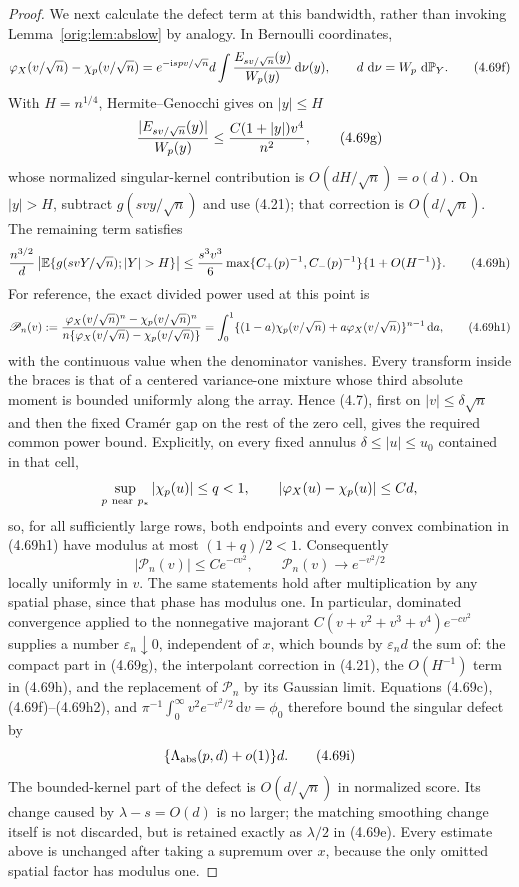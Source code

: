 \documentclass[11pt,a4paper]{article}
\numberwithin{equation}{section}
\theoremstyle{definition}
\theoremstyle{remark}
\newcommand{\E}{\mathbb E}
\newcommand{\Pp}{\mathbb P}
\newcommand{\ii}{\mathrm i}
\newcommand{\dd}{\,\mathrm d}
\begin{document}
\begin{proof}
We next calculate the defect term at this bandwidth, rather than invoking
Lemma~\ref{orig:lem:abslow} by analogy.  In Bernoulli coordinates,
\[
 \varphi_X(v/\sqrt n)-\chi_p(v/\sqrt n)
 =e^{-\ii spv/\sqrt n}d\int
       {E_{sv/\sqrt n}(y)\over W_p(y)}\dd\nu(y),
 \qquad d\,\dd\nu=W_p\,\dd\Pp_Y.                     \tag{4.69f}
\]
With $H=n^{1/4}$, Hermite--Genocchi gives on $|y|\le H$
\[
 { |E_{sv/\sqrt n}(y)|\over W_p(y)}
 \le {C(1+|y|)v^4\over n^2},                         \tag{4.69g}
\]
whose normalized singular-kernel contribution is $O(dH/\sqrt n)=o(d)$.
On $|y|>H$, subtract
$g(svy/\sqrt n)$ and use (4.21); that correction is $O(d/\sqrt n)$.
The remaining term satisfies
\[
 {n^{3/2}\over d}
 \left|\E\{g(svY/\sqrt n);|Y|>H\}\right|
 \le {s^3v^3\over6}
 \max\{C_+(p)^{-1},C_-(p)^{-1}\}
        \{1+O(H^{-1})\}.                               \tag{4.69h}
\]
For reference, the exact divided power used at this point is
\[
 \mathscr P_n(v):={\varphi_X(v/\sqrt n)^n-\chi_p(v/\sqrt n)^n
       \over n\{\varphi_X(v/\sqrt n)-\chi_p(v/\sqrt n)\}}
 =\int_0^1\{(1-a)\chi_p(v/\sqrt n)
                 +a\varphi_X(v/\sqrt n)\}^{n-1}\dd a,              \tag{4.69h1}
\]
with the continuous value when the denominator vanishes.  Every transform
inside the braces is that of a centered variance-one mixture whose third
absolute moment is bounded uniformly along the array.  Hence (4.7), first
on $|v|\le\delta\sqrt n$ and then the fixed Cram\'er gap on the rest of
the zero cell, gives the required common power bound.  Explicitly, on
every fixed annulus \(\delta\le |u|\le u_0\) contained in that cell,
\[
 \sup_{p\ {\rm near}\ p_*}|\chi_p(u)|\le q<1,\qquad
 |\varphi_X(u)-\chi_p(u)|\le C d,
\]
so, for all sufficiently large rows, both endpoints and every convex
combination in (4.69h1) have modulus at most
\((1+q)/2<1\).  Consequently
\[
 |\mathscr P_n(v)|\le Ce^{-cv^2},\qquad
 \mathscr P_n(v)\longrightarrow e^{-v^2/2}             \tag{4.69h2}
\]
locally uniformly in $v$.  The same statements hold after multiplication
by any spatial phase, since that phase has modulus one.  In particular,
dominated convergence applied to the nonnegative majorant
$C(v+v^2+v^3+v^4)e^{-cv^2}$ supplies a number
$\varepsilon_n\downarrow0$, independent of $x$, which bounds by
$\varepsilon_nd$ the sum of: the compact part in (4.69g), the
interpolant correction in (4.21), the $O(H^{-1})$ term in (4.69h), and
the replacement of $\mathscr P_n$ by its Gaussian limit.  Equations
(4.69c), (4.69f)--(4.69h2), and
$\pi^{-1}\int_0^\infty v^2e^{-v^2/2}\dd v=\phi_0$ therefore bound the
singular defect by
\[
 \{\Lambda_{\rm abs}(p,d)+o(1)\}d.                   \tag{4.69i}
\]
The bounded-kernel part of the defect is $O(d/\sqrt n)$ in normalized
score.  Its change caused by $\lambda-s=O(d)$ is no larger; the matching
smoothing change itself is not discarded, but is retained exactly as
$\lambda/2$ in (4.69e).  Every estimate above is unchanged after taking a
supremum over $x$, because the only omitted spatial factor has modulus one.


\end{proof}
\end{document}
